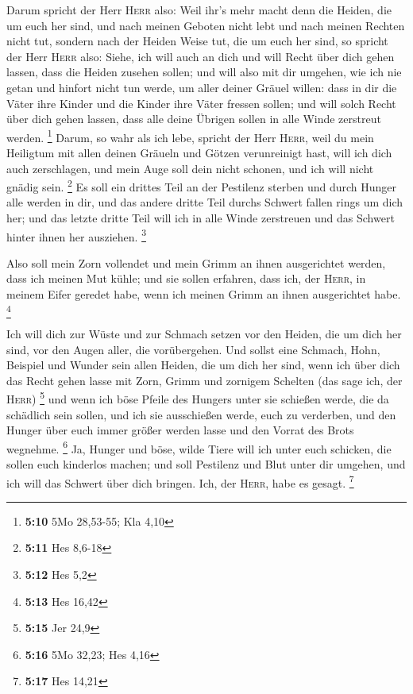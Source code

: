  Darum spricht der Herr \textsc{Herr} also: Weil ihr's
mehr macht denn die Heiden, die um euch her sind, und nach meinen
Geboten nicht lebt und nach meinen Rechten nicht tut, sondern nach der
Heiden Weise tut, die um euch her sind,  so spricht der
Herr \textsc{Herr} also: Siehe, ich will auch an dich und will Recht
über dich gehen lassen, dass die Heiden zusehen sollen; 
und will also mit dir umgehen, wie ich nie getan und hinfort nicht tun
werde, um aller deiner Gräuel willen:  dass in dir die
Väter ihre Kinder und die Kinder ihre Väter fressen sollen; und will
solch Recht über dich gehen lassen, dass alle deine Übrigen sollen in
alle Winde zerstreut werden. \footnote{\textbf{5:10} 5Mo 28,53-55; Kla
  4,10}  Darum, so wahr als ich lebe, spricht der Herr
\textsc{Herr}, weil du mein Heiligtum mit allen deinen Gräueln und
Götzen verunreinigt hast, will ich dich auch zerschlagen, und mein Auge
soll dein nicht schonen, und ich will nicht gnädig sein. \footnote{\textbf{5:11}
  Hes 8,6-18}  Es soll ein drittes Teil an der Pestilenz
sterben und durch Hunger alle werden in dir, und das andere dritte Teil
durchs Schwert fallen rings um dich her; und das letzte dritte Teil will
ich in alle Winde zerstreuen und das Schwert hinter ihnen her ausziehen.
\footnote{\textbf{5:12} Hes 5,2}

 Also soll mein Zorn vollendet und mein Grimm an ihnen
ausgerichtet werden, dass ich meinen Mut kühle; und sie sollen erfahren,
dass ich, der \textsc{Herr}, in meinem Eifer geredet habe, wenn ich
meinen Grimm an ihnen ausgerichtet habe. \footnote{\textbf{5:13} Hes
  16,42}

 Ich will dich zur Wüste und zur Schmach setzen vor den
Heiden, die um dich her sind, vor den Augen aller, die vorübergehen.
 Und sollst eine Schmach, Hohn, Beispiel und Wunder sein
allen Heiden, die um dich her sind, wenn ich über dich das Recht gehen
lasse mit Zorn, Grimm und zornigem Schelten (das sage ich, der
\textsc{Herr}) \footnote{\textbf{5:15} Jer 24,9}  und
wenn ich böse Pfeile des Hungers unter sie schießen werde, die da
schädlich sein sollen, und ich sie ausschießen werde, euch zu verderben,
und den Hunger über euch immer größer werden lasse und den Vorrat des
Brots wegnehme. \footnote{\textbf{5:16} 5Mo 32,23; Hes 4,16}
 Ja, Hunger und böse, wilde Tiere will ich unter euch
schicken, die sollen euch kinderlos machen; und soll Pestilenz und Blut
unter dir umgehen, und ich will das Schwert über dich bringen. Ich, der
\textsc{Herr}, habe es gesagt. \footnote{\textbf{5:17} Hes 14,21}

